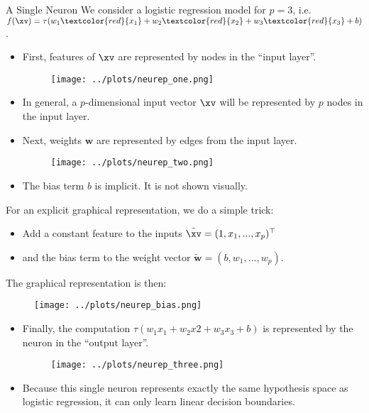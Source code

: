 \begin{vbframe} {A Single Neuron}
We consider a logistic regression model for $p = 3$, i.e. $f(\xv) = \tau(w_1\textcolor{red}{x_1} + w_2\textcolor{red}{x_2} + w_3\textcolor{red}{x_3} + b)$.
\begin{itemize}
\item First, features of $\xv$ are represented by nodes in the \enquote{input layer}.
\begin{figure}
\texttt{[image: ../plots/neurep\_one.png]}
\end{figure}
\item In general, a $p$-dimensional input vector $\xv$ will be represented by $p$ nodes in the input layer.
\framebreak

\item Next, weights $\mathbf{w}$ are represented by edges from the input layer.
\begin{figure}
\texttt{[image: ../plots/neurep\_two.png]}
\end{figure}
\item The bias term $b$ is implicit. It is not shown visually.
\end{itemize}
\framebreak

For an explicit graphical representation, we do a simple trick: 
\begin{itemize}
\item Add a constant feature to the inputs $\tilde{\xv} = (1, x_1, ..., x_p)^\top$
\item and the bias term to the weight vector $\tilde{\bm{w}} = (b, w_1, ..., w_p)$.
\end{itemize}
The graphical representation is then: 
\begin{figure}
\texttt{[image: ../plots/neurep\_bias.png]}
\end{figure}
\framebreak

\begin{itemize}
\item Finally, the computation $\tau(w_1x_1 + w_2x2 + w_3x_3 + b)$ is represented by the neuron in the \enquote{output layer}.
\begin{figure}
\texttt{[image: ../plots/neurep\_three.png]}
\end{figure}
\item Because this single neuron represents exactly the same hypothesis space as logistic regression, it can only learn linear decision boundaries.
\framebreak


\end{itemize}
\end{vbframe}
